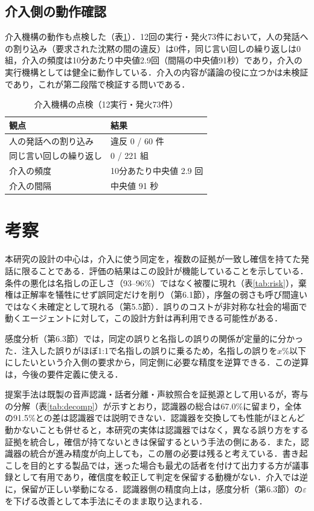 \documentclass[a4paper]{ltjsarticle}
\begin{document}
\subsection{介入側の動作確認}
介入機構の動作も点検した（表\ref{tab:audit}）．12回の実行・発火73件において，人の発話への割り込み（要求された沈黙の間の違反）は0件，同じ言い回しの繰り返しは0組，介入の頻度は10分あたり中央値2.9回（間隔の中央値91秒）であり，介入の実行機構としては健全に動作している．介入の内容が議論の役に立つかは未検証であり，これが第二段階で検証する問いである．

\begin{table}[tb]
\centering
\caption{介入機構の点検（12実行・発火73件）}
\label{tab:audit}
\small
\begin{tabular}{ll}
\toprule
観点 & 結果 \\
\midrule
人の発話への割り込み & 違反 0 / 60 件 \\
同じ言い回しの繰り返し & 0 / 221 組 \\
介入の頻度 & 10分あたり中央値 2.9 回 \\
介入の間隔 & 中央値 91 秒 \\
\bottomrule
\end{tabular}
\end{table}

\section{考察}
本研究の設計の中心は，介入に使う同定を，複数の証拠が一致し確信を持てた発話に限ることである．評価の結果はこの設計が機能していることを示している．条件の悪化は名指しの正しさ（93--96\%）ではなく被覆に現れ（表\ref{tab:risk}），棄権は正解率を犠牲にせず誤同定だけを削り（第6.1節），序盤の弱さも呼び間違いではなく未確定として現れる（第5.5節）．誤りのコストが非対称な社会的場面で動くエージェントに対して，この設計方針は再利用できる可能性がある．

感度分析（第6.3節）では，同定の誤りと名指しの誤りの関係が定量的に分かった．注入した誤りがほぼ1:1で名指しの誤りに乗るため，名指しの誤りを$x$\%以下にしたいという介入側の要求から，同定側に必要な精度を逆算できる．この逆算は，今後の要件定義に使える．

提案手法は既製の音声認識・話者分離・声紋照合を証拠源として用いるが，寄与の分解（表\ref{tab:decomp}）が示すとおり，認識器の総合は67.0\%に留まり，全体の91.5\%との差は認識器では説明できない．認識器を交換しても性能がほとんど動かないことも併せると，本研究の実体は認識器ではなく，異なる誤り方をする証拠を統合し，確信が持てないときは保留するという手法の側にある．また，認識器の統合が進み精度が向上しても，この層の必要は残ると考えている．書き起こしを目的とする製品では，迷った場合も最尤の話者を付けて出力する方が議事録として有用であり，確信度を較正して判定を保留する動機がない．介入では逆に，保留が正しい挙動になる．認識器側の精度向上は，感度分析（第6.3節）の$\varepsilon$を下げる改善として本手法にそのまま取り込まれる．
\end{document}
